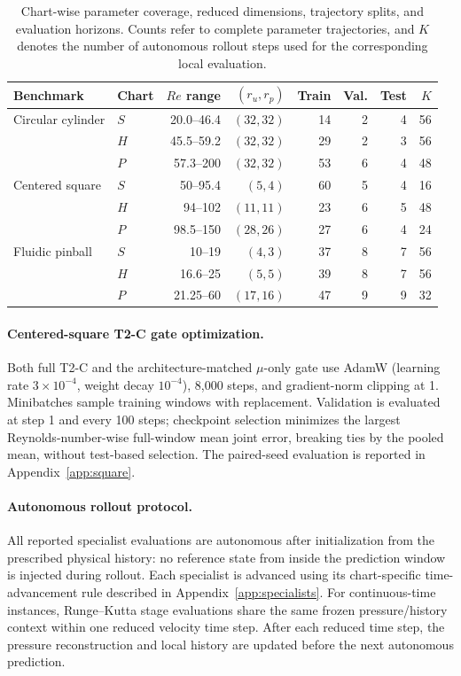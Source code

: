 \documentclass{article}
\begin{document}
\par
\begin{table}[H]
\centering
\caption{
Chart-wise parameter coverage, reduced dimensions, trajectory splits, and evaluation horizons. Counts refer to complete parameter trajectories, and $K$ denotes the number of autonomous rollout steps used for the corresponding local evaluation.
}
\label{tab:chart_splits}
\small
\setlength{\tabcolsep}{3.5pt}
\begin{tabular}{@{}llrrrrrr@{}}
\toprule
Benchmark & Chart & $Re$ range & $(r_u,r_p)$ & Train & Val. & Test & $K$ \\
\midrule
Circular cylinder
& $S$ & 20.0--46.4 & $(32,32)$ & 14 & 2 & 4 & 56 \\
& $H$ & 45.5--59.2 & $(32,32)$ & 29 & 2 & 3 & 56 \\
& $P$ & 57.3--200 & $(32,32)$ & 53 & 6 & 4 & 48 \\
\addlinespace
Centered square
& $S$ & 50--95.4 & $(5,4)$ & 60 & 5 & 4 & 16 \\
& $H$ & 94--102 & $(11,11)$ & 23 & 6 & 5 & 48 \\
& $P$ & 98.5--150 & $(28,26)$ & 27 & 6 & 4 & 24 \\
\addlinespace
Fluidic pinball
& $S$ & 10--19 & $(4,3)$ & 37 & 8 & 7 & 56 \\
& $H$ & 16.6--25 & $(5,5)$ & 39 & 8 & 7 & 56 \\
& $P$ & 21.25--60 & $(17,16)$ & 47 & 9 & 9 & 32 \\
\bottomrule
\end{tabular}
\end{table}
\par


\paragraph{Centered-square T2-C gate optimization.}
Both full T2-C and the architecture-matched $\mu$-only gate use AdamW
(learning rate $3\times10^{-4}$, weight decay $10^{-4}$), 8,000 steps,
and gradient-norm clipping at 1. Minibatches sample training windows with
replacement. Validation is evaluated at step 1 and every 100 steps;
checkpoint selection minimizes the largest Reynolds-number-wise full-window mean joint
error, breaking ties by the pooled mean, without test-based selection.
The paired-seed evaluation is reported in Appendix~\ref{app:square}.



\paragraph{Autonomous rollout protocol.}
All reported specialist evaluations are autonomous after initialization from the prescribed physical history: no reference state from inside the prediction window is injected during rollout.
Each specialist is advanced using its chart-specific time-advancement rule described in Appendix~\ref{app:specialists}. For continuous-time instances, Runge--Kutta stage evaluations share the same frozen pressure/history context within one reduced velocity time step. After each reduced time step, the pressure reconstruction and local history are updated before the next autonomous prediction.
\end{document}
